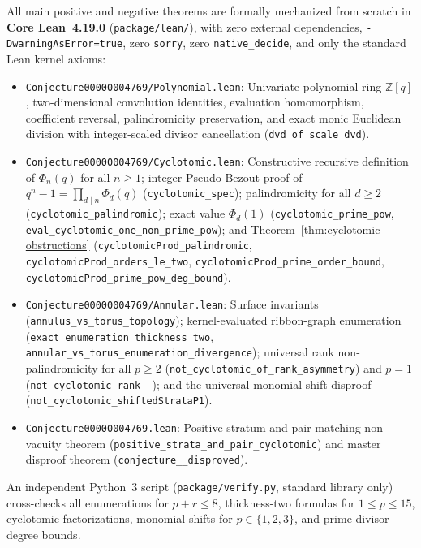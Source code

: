 \documentclass[11pt,a4paper]{article}
\theoremstyle{definition}
\theoremstyle{remark}
\begin{document}
All main positive and negative theorems are formally mechanized from scratch in \textbf{Core Lean~4.19.0} (\texttt{package/lean/}), with zero external dependencies, \texttt{-DwarningAsError=true}, zero \texttt{sorry}, zero \texttt{native\_decide}, and only the standard Lean kernel axioms:
{\sloppy
\begin{itemize}
  \item \texttt{Conjecture00000004769/\allowbreak Polynomial.lean}: Univariate polynomial ring $\mathbb{Z}[q]$, two-dimensional convolution identities, evaluation homomorphism, coefficient reversal, palindromicity preservation, and exact monic Euclidean division with integer-scaled divisor cancellation (\texttt{dvd\_\allowbreak of\_\allowbreak scale\_\allowbreak dvd}).
  \item \texttt{Conjecture00000004769/\allowbreak Cyclotomic.lean}: Constructive recursive definition of $\Phi_n(q)$ for all $n \ge 1$; integer Pseudo-Bezout proof of $q^n - 1 = \prod_{d \mid n} \Phi_d(q)$ (\texttt{cyclotomic\_\allowbreak spec}); palindromicity for all $d \ge 2$ (\texttt{cyclotomic\_\allowbreak palindromic}); exact value $\Phi_d(1)$ (\texttt{cyclotomic\_\allowbreak prime\_\allowbreak pow}, \texttt{eval\_\allowbreak cyclotomic\_\allowbreak one\_\allowbreak non\_\allowbreak prime\_\allowbreak pow}); and Theorem~\ref{thm:cyclotomic-obstructions} (\texttt{cyclotomicProd\_\allowbreak palindromic}, \texttt{cyclotomicProd\_\allowbreak orders\_\allowbreak le\_\allowbreak two}, \texttt{cyclotomicProd\_\allowbreak prime\_\allowbreak order\_\allowbreak bound}, \texttt{cyclotomicProd\_\allowbreak prime\_\allowbreak pow\_\allowbreak deg\_\allowbreak bound}).
  \item \texttt{Conjecture00000004769/\allowbreak Annular.lean}: Surface invariants (\texttt{annulus\_\allowbreak vs\_\allowbreak torus\_\allowbreak topology}); kernel-evaluated ribbon-graph enumeration (\texttt{exact\_\allowbreak enumeration\_\allowbreak thickness\_\allowbreak two}, \texttt{annular\_\allowbreak vs\_\allowbreak torus\_\allowbreak enumeration\_\allowbreak divergence}); universal rank non-palindromicity for all $p \ge 2$ (\texttt{not\_\allowbreak cyclotomic\_\allowbreak of\_\allowbreak rank\_\allowbreak asymmetry}) and $p = 1$ (\texttt{not\_\allowbreak cyclotomic\_\allowbreak rank\_\_}); and the universal monomial-shift disproof (\texttt{not\_\allowbreak cyclotomic\_\allowbreak shiftedStrataP1}).
  \item \texttt{Conjecture00000004769.lean}: Positive stratum and pair-matching non-vacuity theorem (\texttt{positive\_\allowbreak strata\_\allowbreak and\_\allowbreak pair\_\allowbreak cyclotomic}) and master disproof theorem (\texttt{conjecture\_\_\allowbreak disproved}).
\end{itemize}
}
An independent Python~3 script (\texttt{package/verify.py}, standard library only) cross-checks all enumerations for $p + r \le 8$, thickness-two formulas for $1 \le p \le 15$, cyclotomic factorizations, monomial shifts for $p \in \{1,2,3\}$, and prime-divisor degree bounds.
\end{document}
